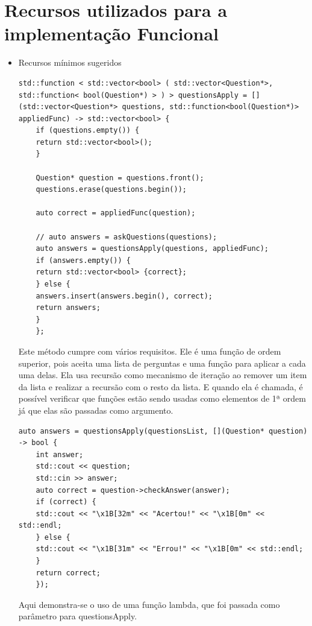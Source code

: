 \documentclass[rel_mlp]{iiufrgs}
\begin{document}
\section{Recursos utilizados para a implementação Funcional}
\begin{itemize}
	\item Recursos mínimos sugeridos
	
	\begin{lstlisting}std::function < std::vector<bool> ( std::vector<Question*>, std::function< bool(Question*) > ) > questionsApply = [](std::vector<Question*> questions, std::function<bool(Question*)> appliedFunc) -> std::vector<bool> {
	if (questions.empty()) { 
	return std::vector<bool>();
	}
	
	Question* question = questions.front();
	questions.erase(questions.begin());
	
	auto correct = appliedFunc(question);
	
	// auto answers = askQuestions(questions);
	auto answers = questionsApply(questions, appliedFunc);
	if (answers.empty()) {
	return std::vector<bool> {correct};
	} else {
	answers.insert(answers.begin(), correct);
	return answers;
	}
	};
	\end{lstlisting}
	
	Este método cumpre com vários requisitos. Ele é uma função de ordem superior, pois aceita uma lista de perguntas e uma função para aplicar a cada uma delas. Ela usa recursão como mecanismo de iteração ao remover um item da lista e realizar a recursão com o resto da lista. E quando ela é chamada, é possível verificar que funções estão sendo usadas como elementos de 1ª ordem já que elas são passadas como argumento.
	
	
	\begin{lstlisting}auto answers = questionsApply(questionsList, [](Question* question) -> bool {
	int answer;
	std::cout << question;
	std::cin >> answer;
	auto correct = question->checkAnswer(answer);
	if (correct) {
	std::cout << "\x1B[32m" << "Acertou!" << "\x1B[0m" << std::endl;
	} else {
	std::cout << "\x1B[31m" << "Errou!" << "\x1B[0m" << std::endl;
	}
	return correct;
	});
	\end{lstlisting}
	
	Aqui demonstra-se o uso de uma função lambda, que foi passada como parâmetro para questionsApply.
	
	
\end{itemize}
\end{document}

